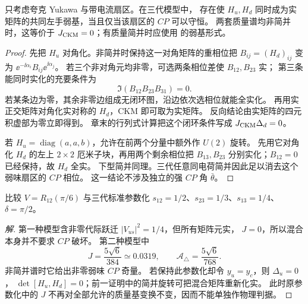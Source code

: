 \begin{proposition}[弱味 $CP$ 守恒的实基判据]
只考虑夸克 Yukawa 与带电流扇区。在三代模型中，
存在使 $H_u,H_d$ 同时成为实矩阵的共同左手弱基，当且仅当该扇区的 $CP$ 可以守恒。
两套质量谱均非简并时，这等价于 $J_{\rm CKM}=0$；有质量简并时应使用
 的弱基形式。
\end{proposition}
\begin{proof}
先把 $H_u$ 对角化。非简并时保持这一对角矩阵的重相位把
$B_{ij}=(H_d)_{ij}$ 变为 $\ee^{-\ii\alpha_i}B_{ij}\ee^{\ii\alpha_j}$。
若三个非对角元均非零，可选两条相位差使 $B_{12},B_{23}$ 实；
第三条能同时实化的充要条件为
\begin{equation*}
\Im(B_{12}B_{23}B_{31})=0.
\end{equation*}
若某条边为零，其余非零边组成无闭环图，沿边依次选相位就能全实化。
再用实正交矩阵对角化实对称的 $H_d$，CKM 即可取为实矩阵。
反向结论由实矩阵的四元积虚部为零立即得到。
章末的行列式计算把这个闭环条件写成 $J_{\rm CKM}\Delta_d=0$。

若 $H_u=\operatorname{diag}(a,a,b)$，允许在前两个分量中额外作 $U(2)$ 旋转。
先用它对角化 $H_d$ 的左上 $2\times2$ 厄米子块，再用两个剩余相位把
$B_{13},B_{23}$ 分别实化；$B_{12}=0$ 已经保持，故 $H_d$ 全实。
下型简并同理。三代任意同电荷简并因此足以消去这个弱味扇区的 $CP$ 相位。
这一结论不涉及独立的强 $CP$ 角 $\bar\theta$。
\end{proof}

\begin{example}
比较 $V=R_{12}(\pi/6)$ 与三代标准参数化
$s_{12}=1/2$、$s_{23}=1/3$、$s_{13}=1/4$、$\delta=\pi/2$。
\end{example}
\begin{proof}[解]
第一种模型含非零代际跃迁 $|V_{us}|^2=1/4$，但所有矩阵元实，
$J=0$，所以混合本身并不要求 $CP$ 破坏。
第二种模型中
\begin{equation*}
J=\frac{5\sqrt6}{384}\simeq0.0319,\qquad
\mathscr A_\triangle=\frac{5\sqrt6}{768}.
\end{equation*}
非简并谱时它给出非零弱味 $CP$ 奇量。
若保持此参数化却令 $y_u=y_c$，则 $\Delta_u=0$，
$\det[H_u,H_d]=0$；前一证明中的简并旋转可把混合矩阵重新化实。
此时原参数化中的 $J$ 不再对全部允许的质量基变换不变，因而不能单独作物理判据。
\end{proof}

